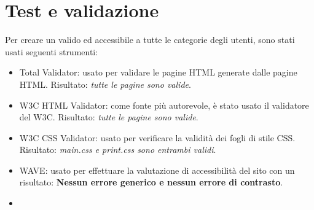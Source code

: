 \documentclass[1_relazione.tex]{subfiles}
\begin{document}
    \section{Test e validazione}\label{sec:test-e-validazione}
    Per creare un valido ed accessibile a tutte le categorie degli utenti, sono stati usati seguenti strumenti:
    \begin{itemize}
        \item{Total Validator}: usato per validare le pagine HTML generate dalle pagine HTML. Risultato: \textit{tutte le pagine sono valide}.
        \item{W3C HTML Validator}: come fonte pi\`{u} autorevole, \`{e} stato usato il validatore del W3C. Risultato: \textit{tutte le pagine sono valide}.
        \item{W3C CSS Validator}: usato per verificare la validit\`{a} dei fogli di stile CSS. Risultato: \textit{main.css e print.css sono entrambi validi}.
        \item{WAVE}: usato per effettuare la valutazione di accessibilit\`{a} del sito con un risultato: \textbf{Nessun errore generico e nessun errore di contrasto}.
        \item{}
    \end{itemize}
\end{document}
